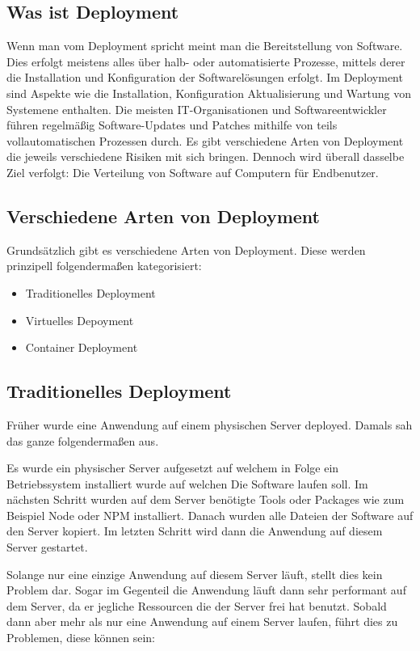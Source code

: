 \subsection{Was ist Deployment}

Wenn man vom Deployment spricht meint man die Bereitstellung von Software. Dies erfolgt meistens alles über halb- oder automatisierte Prozesse, mittels derer die Installation und Konfiguration der Softwarelösungen erfolgt. Im Deployment sind Aspekte wie die Installation, Konfiguration Aktualisierung und Wartung von Systemene enthalten.
Die meisten IT-Organisationen und Softwareentwickler führen regelmäßig Software-Updates und Patches mithilfe von teils vollautomatischen Prozessen durch. Es gibt verschiedene Arten von Deployment die jeweils verschiedene Risiken mit sich bringen. Dennoch wird überall dasselbe Ziel verfolgt: Die Verteilung von Software auf Computern für Endbenutzer.


\subsection{Verschiedene Arten von Deployment}

Grundsätzlich gibt es verschiedene Arten von Deployment. Diese werden prinzipell folgendermaßen kategorisiert:
    \begin{itemize}
    \item Traditionelles Deployment
    \item Virtuelles Depoyment
    \item Container Deployment
    \end{itemize}

\subsection{Traditionelles Deployment}

Früher wurde eine Anwendung auf einem physischen Server deployed. Damals sah das ganze folgendermaßen aus.

Es wurde ein physischer Server aufgesetzt auf welchem in Folge ein Betriebssystem installiert wurde auf welchen Die Software laufen soll. Im nächsten Schritt wurden auf dem Server benötigte Tools oder Packages wie zum Beispiel Node oder NPM installiert. Danach wurden alle Dateien der Software auf den Server kopiert. Im letzten Schritt wird dann die Anwendung auf diesem Server gestartet.


Solange nur eine einzige Anwendung auf diesem Server läuft, stellt dies kein Problem dar. Sogar im Gegenteil die Anwendung läuft dann sehr performant auf dem Server, da er jegliche Ressourcen die der Server frei hat benutzt. Sobald dann aber mehr als nur eine Anwendung auf einem Server laufen, führt dies zu Problemen, diese können sein:

